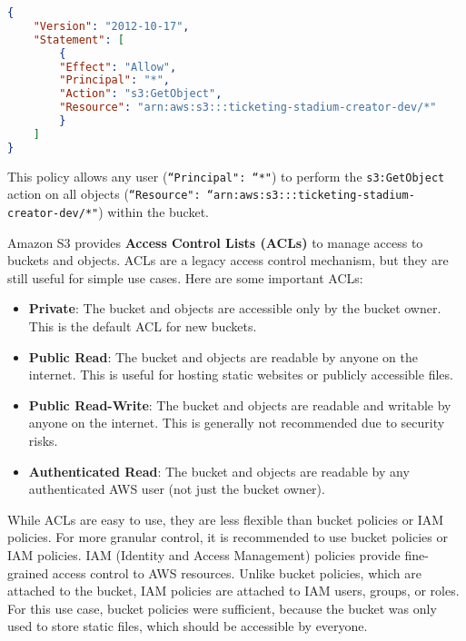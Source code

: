 \begin{lstlisting}[language=json,caption=Bucket Policy JSON Configuration, label=lst:bucket-policy]
{
    "Version": "2012-10-17",
    "Statement": [
        {
        "Effect": "Allow",
        "Principal": "*",
        "Action": "s3:GetObject",
        "Resource": "arn:aws:s3:::ticketing-stadium-creator-dev/*"
        }
    ]
}
\end{lstlisting}

This policy allows any user (\texttt{``Principal": ``*"}) to perform the \texttt{s3:GetObject} action on all objects (\texttt{``Resource": ``arn:aws:s3:::ticketing-stadium-creator-dev/*"}) within the bucket.

Amazon S3 provides \textbf{Access Control Lists (ACLs)} to manage access to buckets and objects. ACLs are a legacy access control mechanism, but they are still useful for simple use cases. Here are some important ACLs:

\begin{itemize}
    \item \textbf{Private}: The bucket and objects are accessible only by the bucket owner. This is the default ACL for new buckets.
    \item \textbf{Public Read}: The bucket and objects are readable by anyone on the internet. This is useful for hosting static websites or publicly accessible files.
    \item \textbf{Public Read-Write}: The bucket and objects are readable and writable by anyone on the internet. This is generally not recommended due to security risks.
    \item \textbf{Authenticated Read}: The bucket and objects are readable by any authenticated AWS user (not just the bucket owner).
\end{itemize}

While ACLs are easy to use, they are less flexible than bucket policies or IAM policies. For more granular control, it is recommended to use bucket policies or IAM policies. IAM (Identity and Access Management) policies provide fine-grained access control to AWS resources. Unlike bucket policies, which are attached to the bucket, IAM policies are attached to IAM users, groups, or roles. For this use case, bucket policies were sufficient, because the bucket was only used to store static files, which should be accessible by everyone.